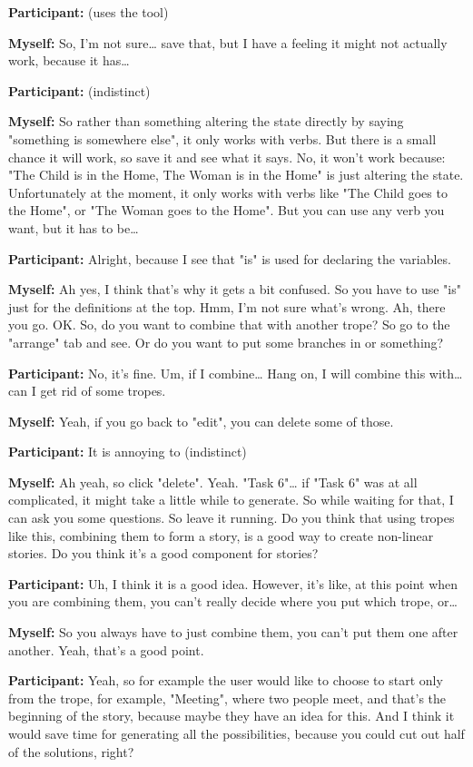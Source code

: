 \documentclass[11pt]{report}
\begin{document}
\begin{linenumbers}
\textbf{Participant:} (uses the tool)

\textbf{Myself:} So, I'm not sure\ldots{} save that, but I have a feeling it might not actually work, because it has\ldots{}

\textbf{Participant:} (indistinct)

\textbf{Myself:} So rather than something altering the state directly by saying "something is somewhere else", it only works with verbs. But there is a small chance it will work, so save it and see what it says. No, it won't work because: "The Child is in the Home, The Woman is in the Home" is just altering the state. Unfortunately at the moment, it only works with verbs like "The Child goes to the Home", or "The Woman goes to the Home". But you can use any verb you want, but it has to be\ldots{}

\textbf{Participant:} Alright, because I see that "is" is used for declaring the variables.

\textbf{Myself:} Ah yes, I think that's why it gets a bit confused. So you have to use "is" just for the definitions at the top. Hmm, I'm not sure what's wrong. Ah, there you go. OK. So, do you want to combine that with another trope? So go to the "arrange" tab and see. Or do you want to put some branches in or something?

\textbf{Participant:} No, it's fine. Um, if I combine\ldots{} Hang on, I will combine this with\ldots{} can I get rid of some tropes.

\textbf{Myself:} Yeah, if you go back to "edit", you can delete some of those.

\textbf{Participant:} It is annoying to (indistinct)

\textbf{Myself:} Ah yeah, so click "delete". Yeah. "Task 6"\ldots{} if "Task 6" was at all complicated, it might take a little while to generate. So while waiting for that, I can ask you some questions. So leave it running. Do you think that using tropes like this, combining them to form a story, is a good way to create non-linear stories. Do you think it's a good component for stories?

\textbf{Participant:} Uh, I think it is a good idea. However, it's like, at this point when you are combining them, you can't really decide where you put which trope, or\ldots{}

\textbf{Myself:} So you always have to just combine them, you can't put them one after another. Yeah, that's a good point.

\textbf{Participant:} Yeah, so for example the user would like to choose to start only from the trope, for example, "Meeting", where two people meet, and that's the beginning of the story, because maybe they have an idea for this. And I think it would save time for generating all the possibilities, because you could cut out half of the solutions, right?


\end{linenumbers}
\end{document}
